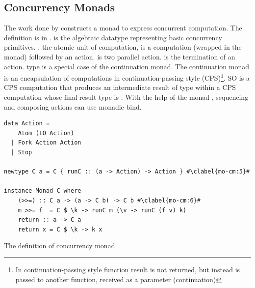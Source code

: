 \subsection{Concurrency Monads}
The work done by \cite{claessenFunctionalPearlsPoor1999} constructs a monad to express concurrent computation. The definition is in .  is the algebraic datatype representing basic concurrency primitives. , the atomic unit of computation, is a computation (wrapped in the  monad) followed by an action.  is two parallel action.  is the termination of an action. type  is a special case of the continuation monad. The continuation monad is an encapsulation of computations in continuation-passing style (CPS)\footnote{In continuation-passing style function result is not returned, but instead is passed to another function, received as a parameter (continuation)\cite{ControlMonadCont}}. SO  is a CPS computation that produces an intermediate result of type  within a CPS computation whose final result type is . With the help of the monad , sequencing and composing actions can use monadic bind.
\begin{code}
  \begin{verbatim}
data Action =
    Atom (IO Action)
  | Fork Action Action
  | Stop

newtype C a = C { runC :: (a -> Action) -> Action } #\clabel{mo-cm:5}#
    
instance Monad C where
    (>>=) :: C a -> (a -> C b) -> C b #\clabel{mo-cm:6}#
    m >>= f  = C $ \k -> runC m (\v -> runC (f v) k)
    return :: a -> C a
    return x = C $ \k -> k x
  \end{verbatim}
  \caption{The definition of concurrency monad}
  \label{b:mo:def}
\end{code}


